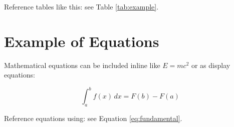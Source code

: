 Reference tables like this: see Table \ref{tab:example}.

\section{Example of Equations}

Mathematical equations can be included inline like $E = mc^2$ or as display equations:

\begin{equation}
    \int_{a}^{b} f(x) \, dx = F(b) - F(a)
    \label{eq:fundamental}
\end{equation}

Reference equations using: see Equation \ref{eq:fundamental}.
